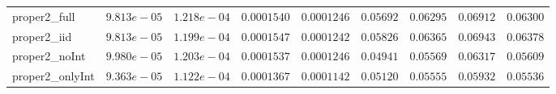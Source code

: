 \begin{table}
\begin{tabular}{lcccccccc}
proper2_full  & $9.813e-05$ & $1.218e-04$ & $0.0001540$ & $0.0001246$ & $0.05692$ & $0.06295$ & $0.06912$ & $0.06300$ \\
proper2_iid  & $9.813e-05$ & $1.199e-04$ & $0.0001547$ & $0.0001242$ & $0.05826$ & $0.06365$ & $0.06943$ & $0.06378$ \\
proper2_noInt  & $9.980e-05$ & $1.203e-04$ & $0.0001537$ & $0.0001246$ & $0.04941$ & $0.05569$ & $0.06317$ & $0.05609$ \\
proper2_onlyInt  & $9.363e-05$ & $1.122e-04$ & $0.0001367$ & $0.0001142$ & $0.05120$ & $0.05555$ & $0.05932$ & $0.05536$ \\
\hline 
\end{tabular}


\end{table}